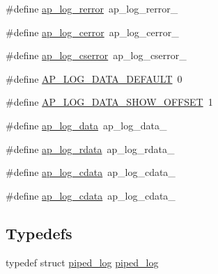 \begin{DoxyCompactItemize}
\item 
\#define \hyperlink{group__APACHE__CORE__LOG_ga4c112558ccffd6b363da102b2052d2a6}{ap\+\_\+log\+\_\+rerror}~ap\+\_\+log\+\_\+rerror\+\_\+
\item 
\#define \hyperlink{group__APACHE__CORE__LOG_ga60ef6919b8e1b691b0c1ac4d67c9449f}{ap\+\_\+log\+\_\+cerror}~ap\+\_\+log\+\_\+cerror\+\_\+
\item 
\#define \hyperlink{group__APACHE__CORE__LOG_gad5cf626e04304c783570bab02a7bd291}{ap\+\_\+log\+\_\+cserror}~ap\+\_\+log\+\_\+cserror\+\_\+
\item 
\#define \hyperlink{group__APACHE__CORE__LOG_ga2bd7f0232a37435953971a8bb8a4d6ca}{A\+P\+\_\+\+L\+O\+G\+\_\+\+D\+A\+T\+A\+\_\+\+D\+E\+F\+A\+U\+LT}~0
\item 
\#define \hyperlink{group__APACHE__CORE__LOG_ga177b79de2a0997a6de01fd94e7be1343}{A\+P\+\_\+\+L\+O\+G\+\_\+\+D\+A\+T\+A\+\_\+\+S\+H\+O\+W\+\_\+\+O\+F\+F\+S\+ET}~1
\item 
\#define \hyperlink{group__APACHE__CORE__LOG_ga8ead657a9fca1b916e489340dd774b43}{ap\+\_\+log\+\_\+data}~ap\+\_\+log\+\_\+data\+\_\+
\item 
\#define \hyperlink{group__APACHE__CORE__LOG_ga89727a9028ffe442e6b25308c6ea4cfd}{ap\+\_\+log\+\_\+rdata}~ap\+\_\+log\+\_\+rdata\+\_\+
\item 
\#define \hyperlink{group__APACHE__CORE__LOG_ga7d8e44ab0c8871375499181416551cd6}{ap\+\_\+log\+\_\+cdata}~ap\+\_\+log\+\_\+cdata\+\_\+
\item 
\#define \hyperlink{group__APACHE__CORE__LOG_ga7d8e44ab0c8871375499181416551cd6}{ap\+\_\+log\+\_\+cdata}~ap\+\_\+log\+\_\+cdata\+\_\+
\end{DoxyCompactItemize}
\subsection*{Typedefs}
\begin{DoxyCompactItemize}
\item 
typedef struct \hyperlink{structpiped__log}{piped\+\_\+log} \hyperlink{group__APACHE__CORE__LOG_gae96bc8ffa52ef0021799f881be200bdd}{piped\+\_\+log}
\end{DoxyCompactItemize}
